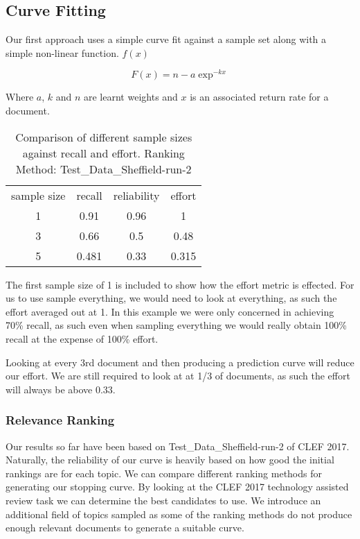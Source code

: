 \subsection{Curve Fitting}

Our first approach uses a simple curve fit against a sample set along with a simple non-linear function. $f(x)$

\begin{equation}
F(x) = n - a\exp^{-kx}
\end{equation}

Where $a$, $k$ and $n$ are learnt weights and $x$ is an associated return rate for a document.

\begin{table}[H]
\centering
\begin{tabular}{|c|c|c|c|} 

 \hline
 sample size & recall & reliability & effort  \\ 
 1 & 0.91 &	0.96	&	1 \\ 
 3 & 0.66 & 0.5	&	0.48 \\ 
 5 & 0.481 & 0.33	&	0.315 \\ 
 \hline
\end{tabular}
\caption{Comparison of different sample sizes against recall and effort. Ranking Method: Test\_Data\_Sheffield-run-2 \cite{Alharbi2017}}

\end{table}

The first sample size of 1 is included to show how the effort metric is effected. For us to use sample everything, we would need to look at everything, as such the effort averaged out at 1. In this example we were only concerned in achieving 70\% recall, as such even when sampling everything we would really obtain 100\% recall at the expense of 100\% effort.

Looking at every 3rd document and then producing a prediction curve will reduce our effort. We are still required to look at at 1/3 of documents, as such the effort will always be above 0.33. 

\subsubsection{Relevance Ranking}

Our results so far have been based on Test\_Data\_Sheffield-run-2 \cite{Alharbi2017} of CLEF 2017. Naturally, the reliability of our curve is heavily based on how good the initial rankings are for each topic. We can compare different ranking methods for generating our stopping curve. By looking at the CLEF 2017 technology assisted review task \cite{Kanoulas12017} we can determine the best candidates to use. We introduce an additional field of topics sampled as some of the ranking methods do not produce enough relevant documents to generate a suitable curve.


